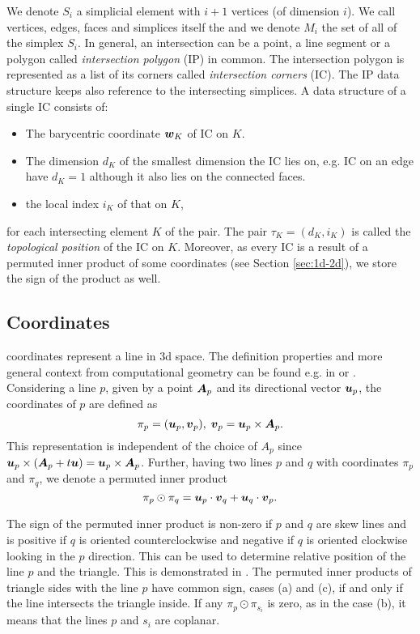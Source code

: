 We denote $S_i$ a simplicial element with $i+1$ vertices (of dimension $i$). We call vertices, edges, faces and simplices itself the \nfaces and we denote
$M_i$ the set of all \nfaces of the simplex $S_i$.
In general, an intersection can be a point, a line segment or a polygon called \emph{intersection polygon} (IP) in common.
The intersection polygon is represented as a list of its corners called \emph{intersection corners} (IC). The IP data structure keeps also 
reference to the intersecting simplices. A data structure of a single IC consists of:
\begin{itemize}
 \item The barycentric coordinate $\mathbf{\boldsymbol{w}}_K$ of IC on $K$.
 \item The dimension $d_K$ of the smallest dimension \nface the IC lies on, e.g. IC on an edge have $d_K=1$ although it also lies on the connected faces.
 \item the local index $i_K$ of that \nface on $K$,
\end{itemize}
for each intersecting element $K$ of the pair. The pair $\tau_K = (d_K, i_K)$
is called the \emph{topological position} of the IC on $K$. Moreover, as every IC is a result of a permuted
inner product of some \plucker coordinates (see Section \ref{sec:1d-2d}), we store the sign of the product as well.


\subsection{\plucker Coordinates}
\plucker coordinates represent a line in 3d space. The definition properties and more general context from computational 
geometry can be found e.g. in \cite{dorst_geometric_2007} or \cite{joswig_plucker_2013}.
Considering a line $p$, given by a point $\mathbf{\boldsymbol{A}}_p$ and its directional vector $\mathbf{\boldsymbol{u}}_p$, 
the \plucker coordinates of $p$ are defined as
\[ \pi_p = (\mathbf{\boldsymbol{u}}_p, \mathbf{\boldsymbol{v}}_p),\; \mathbf{\boldsymbol{v}}_p = \mathbf{\boldsymbol{u}}_p\times \mathbf{\boldsymbol{A}}_p. \]
This representation is independent of the choice of $A_p$ since $\mathbf{\boldsymbol{u}}_p\times (\mathbf{\boldsymbol{A}}_p + t \mathbf{\boldsymbol{u}}) = \mathbf{\boldsymbol{u}}_p\times \mathbf{\boldsymbol{A}}_p$.
Further, having two lines $p$ and $q$ with \plucker coordinates $\pi_p$ and $\pi_q$, we denote a permuted inner product
\[\pi_p \odot \pi_q = \mathbf{\boldsymbol{u}}_p\cdot \mathbf{\boldsymbol{v}}_q + \mathbf{\boldsymbol{u}}_q \cdot \mathbf{\boldsymbol{v}}_p. \]

The sign of the permuted inner product is non-zero if $p$ and $q$ are skew lines and is positive if $q$ is oriented counterclockwise and 
negative if $q$ is oriented clockwise looking in the $p$ direction. This can be used to determine relative position 
of the line $p$ and the triangle. This is demonstrated in .
The permuted inner products of triangle sides with the line $p$ have common sign, cases (a) and (c), if and only if the 
line intersects the triangle inside. If any $\pi_p\odot \pi_{s_i}$ is zero, as in the case (b), 
it means that the lines $p$ and $s_i$ are coplanar.

